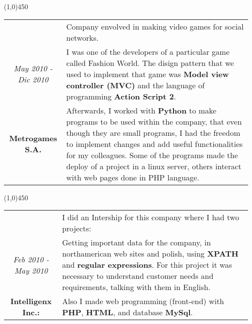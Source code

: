 \begin{center}
\line(1,0){450}
\end{center}
\noindent
\begin{tabular}{c|p{12.5cm}}
& \large Company envolved in making video games for social networks. \\
\large\textit{May 2010 - Dic 2010} &  \large I was one of the developers of a particular game called Fashion World. The disign pattern that we used to implement that game was \textbf{Model view controller (MVC)} and the language of programming \textbf{Action Script 2}.\\
\large\textbf{Metrogames S.A.} & \large Afterwards, I worked with \textbf{Python} to make programs to be used within the company, that even though they are small programs, I had the freedom to implement changes and add useful functionalities for my colleagues. Some of the programs made the deploy of a project in a linux server, others interact with web pages done in PHP language.
\end{tabular}

\begin{center}
\line(1,0){450}
\end{center}
\noindent
\begin{tabular}{c|p{12.5cm}}
& \large I did an Intership for this company where I had two projects:\\
\large\textit{Feb 2010 - May 2010} & \large Getting important data for the company, in northamerican web sites and polish, using \textbf{XPATH} and \textbf{regular expressions}.  For this project it was necessary to understand customer needs and requirements, talking with them in English.\\
\large\textbf{Intelligenx Inc.:} & \large Also I made web programming (front-end) with \textbf{PHP}, \textbf{HTML}, and database \textbf{MySql}.
\end{tabular}


